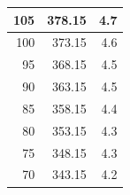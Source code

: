 \begin{longtable}{|r|r|r|}
			105                                                                                                     & 378.15                                                                                                 & 4.7                                                                                                  \\ \hline
			100                                                                                                     & 373.15                                                                                                 & 4.6                                                                                                  \\ \hline
			95                                                                                                      & 368.15                                                                                                 & 4.5                                                                                                  \\ \hline
			90                                                                                                      & 363.15                                                                                                 & 4.5                                                                                                  \\ \hline
			85                                                                                                      & 358.15                                                                                                 & 4.4                                                                                                  \\ \hline
			80                                                                                                      & 353.15                                                                                                 & 4.3                                                                                                  \\ \hline
			75                                                                                                      & 348.15                                                                                                 & 4.3                                                                                                  \\ \hline
			70                                                                                                      & 343.15                                                                                                 & 4.2                                                                                                  \\ \hline

\end{longtable}
